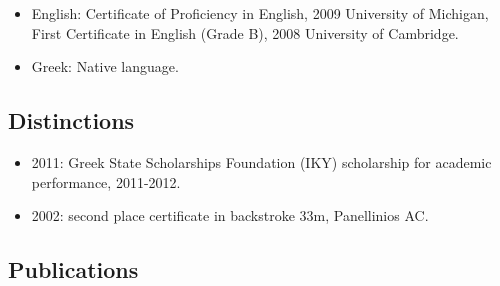 \documentclass[a4paper,oneside,10pt]{article}
\begin{document}
\begin{itemize}

\item English: \textlatin{Certificate of Proficiency in English, 2009 University of Michigan, First Certificate in English (Grade B), 2008 University of Cambridge.}

\item Greek: Native language.

\end{itemize}

\subsection*{Distinctions}

\begin{itemize}

\item 2011: Greek State Scholarships Foundation (IKY) scholarship for academic performance, 2011-2012.

\item 2002: second place certificate in backstroke 33m, Panellinios AC.

\end{itemize}

\subsection*{Publications}
\end{document}
